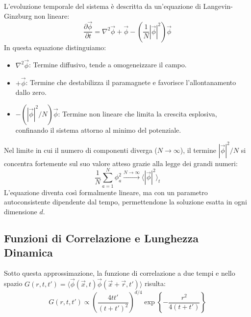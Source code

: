 L'evoluzione temporale del sistema è descritta da un'equazione di Langevin-Ginzburg non lineare:
\begin{equation}
    \frac{\partial \vec{\phi}}{\partial t} = \nabla^2 \vec{\phi} + \vec{\phi} - \left( \frac{1}{N} |\vec{\phi}|^2 \right) \vec{\phi}
\end{equation}
In questa equazione distinguiamo:
\begin{itemize}
    \item $\nabla^2 \vec{\phi}$: Termine diffusivo, tende a omogeneizzare il campo.
    \item $+ \vec{\phi}$: Termine che destabilizza il paramagnete e favorisce l'allontanamento dallo zero.
    \item $- ( |\vec{\phi}|^2 / N ) \vec{\phi}$: Termine non lineare che limita la crescita esplosiva, confinando il sistema attorno al minimo del potenziale.
\end{itemize}

Nel limite in cui il numero di componenti diverga ($N \to \infty$), il termine $|\vec{\phi}|^2/N$ si concentra fortemente sul suo valore atteso grazie alla legge dei grandi numeri:
\begin{equation}
    \frac{1}{N} \sum_{a=1}^N \phi_a^2 \xrightarrow{N \to \infty} \langle |\vec{\phi}|^2 \rangle_t
\end{equation}
L'equazione diventa così formalmente lineare, ma con un parametro autoconsistente dipendente dal tempo, permettendone la soluzione esatta in ogni dimensione $d$.

\subsection{Funzioni di Correlazione e Lunghezza Dinamica}
Sotto questa approssimazione, la funzione di correlazione a due tempi e nello spazio $G(r, t, t') = \langle \vec{\phi}(\vec{x}, t) \vec{\phi}(\vec{x}+\vec{r}, t') \rangle$ risulta:
\begin{equation}
    G(r, t, t') \propto \left( \frac{4tt'}{(t+t')^2} \right)^{d/4} \exp\left\{ - \frac{r^2}{4(t+t')} \right\}
\end{equation}

